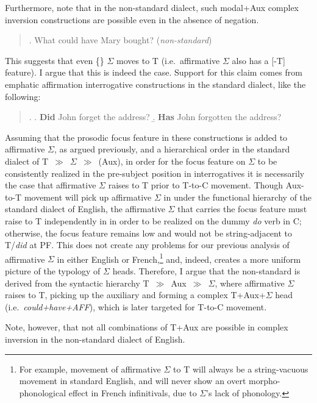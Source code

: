 Furthermore, note that in the non-standard dialect, such modal+Aux complex inversion constructions are possible even in the absence of negation.

\singlespacing
\begin{quote}
\ex. What could have Mary bought? ({\it non-standard})

\end{quote}
\onehalfspacing
This suggests that even \{\mbox{}\} $\Sigma$ moves to T (i.e.\ affirmative $\Sigma$ also has a [-T] feature). I argue that this is indeed the case. Support for this claim comes from emphatic affirmation interrogative constructions in the standard dialect, like the following:

\singlespacing
\begin{quote}
\ex.
\a. {\bf Did} John forget the address?
\b. {\bf Has} John forgotten the address?

\end{quote}
\onehalfspacing
Assuming that the prosodic focus feature in these constructions is added to affirmative $\Sigma$, as argued previously, and a hierarchical order in the standard dialect of T~$\gg$~$\Sigma$~$\gg$~(Aux), in order for the focus feature on $\Sigma$ to be consistently realized in the pre-subject position in interrogatives it is necessarily the case that affirmative $\Sigma$ raises to T prior to T-to-C movement. Though Aux-to-T movement will pick up affirmative $\Sigma$ in \Last[b] under the functional hierarchy of the standard dialect of English, the affirmative $\Sigma$ that carries the focus feature must raise to T independently in \Last[a] in order to be realized on the dummy {\it do} verb in C; otherwise, the focus feature remains low and would not be string-adjacent to T/{\it did} at PF. This does not create any problems for our previous analysis of affirmative $\Sigma$ in either English or French,\footnote{For example, movement of affirmative $\Sigma$ to T will always be a string-vacuous movement in standard English, and will never show an overt morpho-phonological effect in French infinitivals, due to $\Sigma$'s lack of phonology.} and, indeed, creates a more uniform picture of the typology of $\Sigma$ heads. Therefore, I argue that the non-standard \LLast is derived from the syntactic hierarchy T~$\gg$~Aux~$\gg$~$\Sigma$, where affirmative $\Sigma$ raises to T, picking up the auxiliary and forming a complex T+Aux+$\Sigma$ head (i.e.\ {\it could+have+\small{AFF}}), which is later targeted for T-to-C movement.

Note, however, that not all combinations of T+Aux are possible in complex inversion in the non-standard dialect of English.

